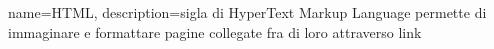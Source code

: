 {
	name={HTML},
	description={sigla di HyperText Markup Language permette di immaginare e formattare pagine collegate fra di loro attraverso link}
}
